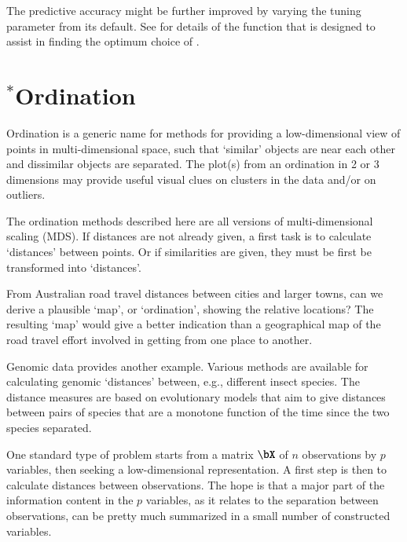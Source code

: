 The predictive accuracy might be further improved by varying the
tuning parameter  from its default.  See 
for details of the function  that is designed to
assist in finding the optimum choice of .

\section{$^*$Ordination}

Ordination is a generic name for methods for providing a low-dimensional
view of points in multi-dimensional space, such that `similar' objects
are near each other and dissimilar objects are separated.  The plot(s)
from an ordination in 2 or 3 dimensions may provide useful visual clues
on clusters in the data and/or on outliers.

The ordination methods described here are all versions of
multi-dimensional scaling (MDS).  If distances are not already given,
a first task is to calculate `distances' between points.  Or if
similarities are given, they must be first be transformed into 
`distances'.

From Australian road travel distances 
between cities and larger towns,
can we derive a plausible `map', or `ordination', showing the relative
locations?  The resulting `map' would give a better indication
than a geographical map of the road travel effort involved in getting
from one place to another.

Genomic data provides another example. Various methods are available
for calculating genomic `distances' between, e.g., different insect
species. The distance measures are based on evolutionary models that
aim to give distances between pairs of species that are a monotone
function of the time since the two species separated.

One standard type of problem starts from a matrix $\bX$ of $n$
observations by $p$ variables, then seeking a low-dimensional
representation.  A first step is then to calculate distances between
observations.
  The hope is that a major part of the information
content in the $p$ variables, as it relates to the separation between
observations, can be pretty much summarized in a small number of
constructed variables.

